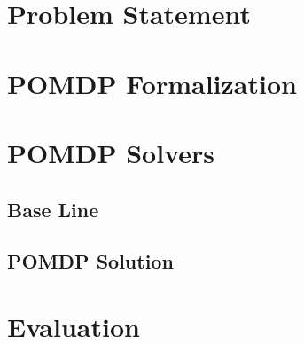 \section{Problem Statement}\label{sec:hri-problem-statement}
\section{POMDP Formalization}\label{sec:hri-pomdp-formalization}
\section{POMDP Solvers}\label{sec:hri-solutions}
\subsection{Base Line}\label{sec:hri-base-line}
\subsection{POMDP Solution}\label{sec:hri-planners}
\section{Evaluation}\label{sec:hri-evaluation}
